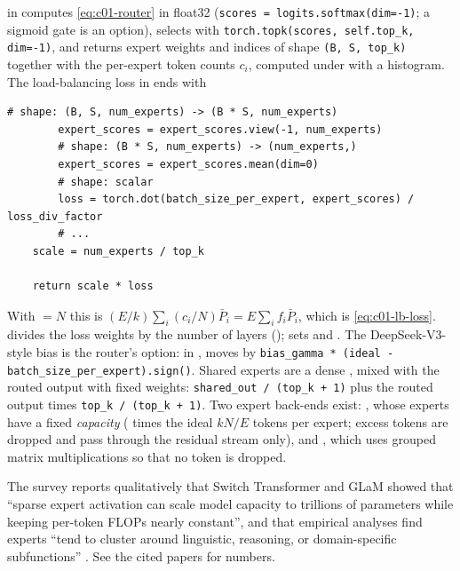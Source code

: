 \begin{implnote}[title={In the code: routing, balancing and shared experts in OLMo-core}]
 in
 computes
\eqref{eq:c01-router} in float32 (\texttt{scores = logits.softmax(dim=-1)}; a sigmoid gate is
an option), selects with \texttt{torch.topk(scores, self.top\_k, dim=-1)}, and returns expert
weights and indices of shape \texttt{(B, S, top\_k)} together with the per-expert token counts
$c_i$, computed under  with a histogram. The load-balancing loss in
 ends with
\begin{lstlisting}[caption={Excerpt from \texttt{repos/\allowbreak allenai\_\_OLMo-core/\allowbreak src/\allowbreak olmo\_core/\allowbreak nn/\allowbreak moe/\allowbreak loss.py}},label={lst:c01-olmo-lb}]
        # shape: (B, S, num_experts) -> (B * S, num_experts)
        expert_scores = expert_scores.view(-1, num_experts)
        # shape: (B * S, num_experts) -> (num_experts,)
        expert_scores = expert_scores.mean(dim=0)
        # shape: scalar
        loss = torch.dot(batch_size_per_expert, expert_scores) / loss_div_factor
        # ...
    scale = num_experts / top_k

    return scale * loss
\end{lstlisting}
With  $= N$ this is
$(E/k)\sum_i (c_i/N)\bar{P}_i = E\sum_i f_i\bar{P}_i$, which is \eqref{eq:c01-lb-loss}.
 divides the loss weights by the number of layers
();  sets  and
. The DeepSeek-V3-style bias is the router's 
option: in ,  moves by
\texttt{bias\_gamma * (ideal - batch\_size\_per\_expert).sign()}. Shared experts are a dense
, mixed with the routed output with fixed weights:
\texttt{shared\_out / (top\_k + 1)} plus the routed output times \texttt{top\_k / (top\_k + 1)}.
Two expert back-ends exist: , whose experts have a fixed \emph{capacity}
( times the ideal $kN/E$ tokens per expert; excess tokens are
dropped and pass through the residual stream only), and , which uses
grouped matrix multiplications so that no token is dropped.
\end{implnote}

\begin{results}[title={Reported results (source: survey PDF in \texttt{papers/})}]
The survey reports qualitatively that Switch Transformer and GLaM showed that ``sparse
expert activation can scale model capacity to trillions of parameters while keeping
per-token FLOPs nearly constant'', and that empirical analyses find experts ``tend to
cluster around linguistic, reasoning, or domain-specific subfunctions''
\citep{zhoubian2026memory}. See the cited papers for numbers.
\end{results}


